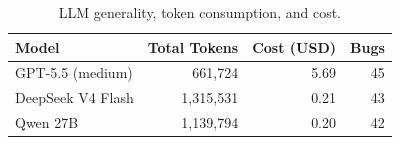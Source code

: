 \begin{table}[h]
\centering
\small
\caption{LLM generality, token consumption, and cost.}
\label{tab:llm_generality}
\setlength{\tabcolsep}{4pt}
\renewcommand{\arraystretch}{1.08}
\begin{tabular*}{\columnwidth}{@{\extracolsep{\fill}}lrrr@{}}
\toprule
\textbf{Model} & \textbf{Total Tokens} & \textbf{Cost (USD)} &
\textbf{Bugs} \\
\midrule
GPT-5.5 (medium) & 661{,}724 & 5.69 & 45 \\
DeepSeek V4 Flash & 1{,}315{,}531 & 0.21 & 43 \\
Qwen 27B & 1{,}139{,}794 & 0.20 & 42 \\
\bottomrule
\end{tabular*}
\end{table}

